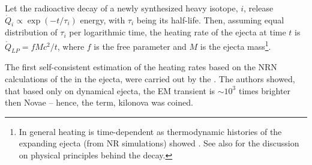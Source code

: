 %
%



Let the radioactive decay of a newly synthesized heavy isotope, $i$, release 
$\dot{Q}_i \propto \exp(-t/\tau_i)$ energy, with $\tau_i$ being its half-life.
Then, assuming equal distribution of $\tau_i$ per logarithmic time, 
the heating rate of the ejecta at time $t$ is 
$\dot{Q}_{LP} = f M c^2 / t$,
where $f$ is the free parameter and $M$ is the ejecta mass\footnote{
    In general heating is time-dependent as thermodynamic histories of the expanding 
    ejecta (from \ac{NR} simulations) showed \citep{Metzger:2010,Roberts:2011,Korobkin:2012uy}.
    See also \citet{Hotokezaka:2017dbk} for the discussion on physical principles behind the decay.
}.
%

The first self-consistent estimation of the heating rates based on the \ac{NRN} 
calculations of the \rproc{} in the ejecta, were carried out by the \citet{Metzger:2010}. 
The authors showed, that based only on dynamical ejecta, the \ac{EM} transient is ${\sim}10^3$ 
times brighter then Novae -- hence, the term, kilonova was coined. 
%
%


